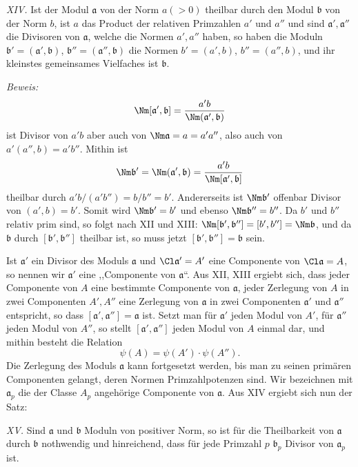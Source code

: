 \emph{XIV.} Ist der Modul $\mathfrak a$ von der Norm $a(>0)$ theilbar durch den Modul $\mathfrak b$ von der Norm $b$, ist $a$ das Product der relativen Primzahlen $a'$ und $a''$ und sind $\mathfrak a',\mathfrak a''$ die Divisoren von $\mathfrak a$, welche die Normen $a',a''$ haben, so haben die Moduln $\mathfrak b'=(\mathfrak a',\mathfrak b)$, $\mathfrak b''=(\mathfrak a'',\mathfrak b)$ die Normen $b'=(a',b)$, $b''=(a'',b)$, und ihr kleinstes gemeinsames Vielfaches ist $\mathfrak b$.

\emph{Beweis:}
\[
 \Nm[\mathfrak a',\mathfrak b]
 ={a'b\over \Nm(\mathfrak a',\mathfrak b)}
\]
ist Divisor von $a'b$ aber auch von $\Nm\mathfrak a=a=a'a''$, also auch von $a'(a'',b)=a'b''$. Mithin ist
\[
 \Nm\mathfrak b'=\Nm(\mathfrak a',\mathfrak b)
 ={a'b\over \Nm[\mathfrak a',\mathfrak b]}
\]
theilbar durch $a'b/(a'b'')=b/b''=b'$. Andererseits ist $\Nm\mathfrak b'$ offenbar Divisor von $(a',b)=b'$. Somit wird $\Nm\mathfrak b'=b'$ und ebenso $\Nm\mathfrak b''=b''$. Da $b'$ und $b''$ relativ prim sind, so folgt nach XII und XIII: $\Nm[\mathfrak b',\mathfrak b'']=[b',b'']=\Nm\mathfrak b$, und da $\mathfrak b$ durch $[\mathfrak b',\mathfrak b'']$ theilbar ist, so muss jetzt $[\mathfrak b',\mathfrak b'']=\mathfrak b$ sein.

Ist $\mathfrak a'$ ein Divisor des Moduls $\mathfrak a$ und $\Cl\mathfrak a'=A'$ eine Componente von $\Cl\mathfrak a=A$, so nennen wir $\mathfrak a'$ eine ,,Componente von $\mathfrak a$``. Aus XII, XIII ergiebt sich, dass jeder Componente von $A$ eine bestimmte Componente von $\mathfrak a$, jeder Zerlegung von $A$ in zwei Componenten $A',A''$ eine Zerlegung von $\mathfrak a$ in zwei Componenten $\mathfrak a'$ und $\mathfrak a''$ entspricht, so dass $[\mathfrak a',\mathfrak a'']=\mathfrak a$ ist. Setzt man für $\mathfrak a'$ jeden Modul von $A'$, für $\mathfrak a''$ jeden Modul von $A''$, so stellt $[\mathfrak a',\mathfrak a'']$ jeden Modul von $A$ einmal dar, und mithin besteht die Relation
\begin{equation}
 \psi(A)=\psi(A')\cdot\psi(A'').
\tag{5}
\end{equation}
Die Zerlegung des Moduls $\mathfrak a$ kann fortgesetzt werden, bis man zu seinen primären Componenten gelangt, deren Normen Primzahlpotenzen sind. Wir bezeichnen mit $\mathfrak a_p$ die der Classe $A_p$ angehörige Componente von $\mathfrak a$. Aus XIV ergiebt sich nun der Satz:

\emph{XV.} Sind $\mathfrak a$ und $\mathfrak b$ Moduln von positiver Norm, so ist für die Theilbarkeit von $\mathfrak a$ durch $\mathfrak b$ nothwendig und hinreichend, dass für jede Primzahl $p$ $\mathfrak b_p$ Divisor von $\mathfrak a_p$ ist.


